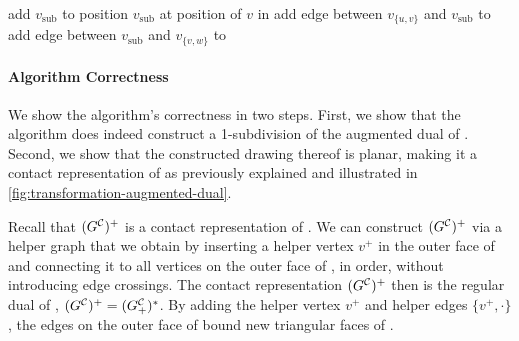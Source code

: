 \begin{algorithm}[H]
{    \label{line:transformation-loop3-start}
    add  $v_\text{sub}$ to \initmap{}\; \label{line:transformation-subdivisionvertex3}
    position $v_\text{sub}$ at position of $v$ in \clustergraph{}\;
    add edge between $v_{\{u,v\}}$ and $v_\text{sub}$ to \initmap{}\; \label{line:transformation-edgetype3-start}
    add edge between $v_\text{sub}$ and $v_{\{v,w\}}$ to \initmap{}\; \label{line:transformation-edgetype3-end}
    \label{line:transformation-loop3-end}
  }
  \BlankLine
  \Return \initmap{}
\end{algorithm}
\vfill



\paragraph{Algorithm Correctness}

We show the algorithm's correctness in two steps.
First, we show that the algorithm does indeed construct a 1-subdivision of the augmented dual of \clustergraph{}.
Second, we show that the constructed drawing thereof is planar, making it a contact representation of \clustergraph{} as previously explained and illustrated in \cref{fig:transformation-augmented-dual}.

Recall that $(G^\mathcal{C}_{})^+$ is a contact representation of \clustergraph{}.
We can construct $(G^\mathcal{C}_{})^+$ via a helper graph \clustergraph{+} that we obtain by inserting a helper vertex $v^+$ in the outer face of \clustergraph{} and connecting it to all vertices on the outer face of \clustergraph{}, in order, without introducing edge crossings.
The contact representation $(G^\mathcal{C}_{})^+$ then is the regular dual of \clustergraph{+}, \ie{} $(G^\mathcal{C}_{})^+ = (G^\mathcal{C}_{+})^*$.
By adding the helper vertex $v^+$ and helper edges $\{v^+,\cdot\}$, the edges on the outer face of \clustergraph{} bound new triangular faces of \clustergraph{+}.

